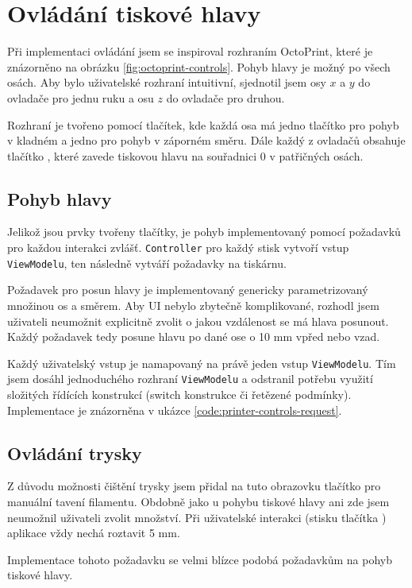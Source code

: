 \section{Ovládání tiskové hlavy}

Při implementaci ovládání jsem se inspiroval rozhraním OctoPrint, které je znázorněno na obrázku \ref{fig:octoprint-controls}.
Pohyb hlavy je možný po všech osách.
Aby bylo uživatelské rozhraní intuitivní, sjednotil jsem osy $x$ a $y$ do ovladače pro jednu ruku a osu $z$ do ovladače pro druhou.


Rozhraní je tvořeno pomocí tlačítek, kde každá osa má jedno tlačítko pro pohyb v kladném a jedno pro pohyb v záporném směru.
Dále každý z ovladačů obsahuje tlačítko , které zavede tiskovou hlavu na souřadnici 0 v patřičných osách.

\subsection{Pohyb hlavy}

Jelikož jsou prvky tvořeny tlačítky, je pohyb implementovaný pomocí požadavků pro každou interakci zvlášť.
\texttt{Controller} pro každý stisk vytvoří vstup \texttt{ViewModelu}, ten následně vytváří požadavky na tiskárnu.

Požadavek pro posun hlavy je implementovaný genericky parametrizovaný množinou os a směrem.
Aby UI nebylo zbytečně komplikované, rozhodl jsem uživateli neumožnit explicitně zvolit o jakou vzdálenost se má hlava posunout.
Každý požadavek tedy posune hlavu po dané ose o 10 mm vpřed nebo vzad.

Každý uživatelský vstup je namapovaný na právě jeden vstup \texttt{ViewModelu}.
Tím jsem dosáhl jednoduchého rozhraní \texttt{ViewModelu} a odstranil potřebu využití složitých řídících konstrukcí (switch konstrukce či řetězené podmínky).
Implementace je znázorněna v ukázce \ref{code:printer-controls-request}.


\subsection{Ovládání trysky}

Z důvodu možnosti čištění trysky jsem přidal na tuto obrazovku tlačítko pro manuální tavení filamentu.
Obdobně jako u pohybu tiskové hlavy ani zde jsem neumožnil uživateli zvolit množství.
Při uživatelské interakci (stisku tlačítka ) aplikace vždy nechá roztavit 5 mm.

Implementace tohoto požadavku se velmi blízce podobá požadavkům na pohyb tiskové hlavy.
